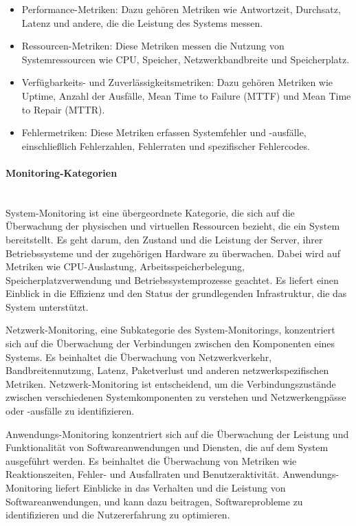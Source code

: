 \begin{itemize}
\item Performance-Metriken: Dazu gehören Metriken wie Antwortzeit, Durchsatz, Latenz und andere, die die Leistung des Systems messen.
\item Ressourcen-Metriken: Diese Metriken messen die Nutzung von Systemressourcen wie CPU, Speicher, Netzwerkbandbreite und Speicherplatz.
\item Verfügbarkeits- und Zuverlässigkeitsmetriken: Dazu gehören Metriken wie Uptime, Anzahl der Ausfälle, Mean Time to Failure (MTTF) und Mean Time to Repair (MTTR).
\item Fehlermetriken: Diese Metriken erfassen Systemfehler und -ausfälle, einschließlich Fehlerzahlen, Fehlerraten und spezifischer Fehlercodes.
\end{itemize}
\paragraph{Monitoring-Kategorien \\\\}
System-Monitoring ist eine übergeordnete Kategorie, die sich auf die Überwachung der physischen und virtuellen Ressourcen bezieht, die ein System bereitstellt. Es geht darum, den Zustand und die Leistung der Server, ihrer Betriebssysteme und der zugehörigen Hardware zu überwachen. Dabei wird auf Metriken wie CPU-Auslastung, Arbeitsspeicherbelegung, Speicherplatzverwendung und Betriebssystemprozesse geachtet. Es liefert einen Einblick in die Effizienz und den Status der grundlegenden Infrastruktur, die das System unterstützt.

Netzwerk-Monitoring, eine Subkategorie des System-Monitorings, konzentriert sich auf die Überwachung der Verbindungen zwischen den Komponenten eines Systems. Es beinhaltet die Überwachung von Netzwerkverkehr, Bandbreitennutzung, Latenz, Paketverlust und anderen netzwerkspezifischen Metriken. Netzwerk-Monitoring ist entscheidend, um die Verbindungszustände zwischen verschiedenen Systemkomponenten zu verstehen und Netzwerkengpässe oder -ausfälle zu identifizieren.

Anwendungs-Monitoring konzentriert sich auf die Überwachung der Leistung und Funktionalität von Softwareanwendungen und Diensten, die auf dem System ausgeführt werden. Es beinhaltet die Überwachung von Metriken wie Reaktionszeiten, Fehler- und Ausfallraten und Benutzeraktivität. Anwendungs-Monitoring liefert Einblicke in das Verhalten und die Leistung von Softwareanwendungen, und kann dazu beitragen, Softwareprobleme zu identifizieren und die Nutzererfahrung zu optimieren.

